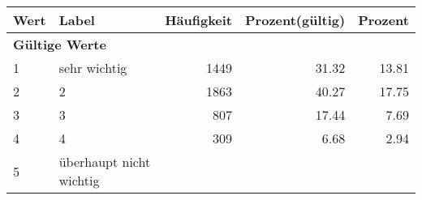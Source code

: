      \begin{longtable}{lXrrr}
     \toprule
     \textbf{Wert} & \textbf{Label} & \textbf{Häufigkeit} & \textbf{Prozent(gültig)} & \textbf{Prozent} \\
     \endhead
     \midrule
     \multicolumn{5}{l}{\textbf{Gültige Werte}}\\

     1 &
     \multicolumn{1}{X}{ sehr wichtig   } &


       \num{1449} &
       \num[round-mode=places,round-precision=2]{31,32} &
         \num[round-mode=places,round-precision=2]{13,81} \\

     2 &
     \multicolumn{1}{X}{ 2   } &


       \num{1863} &
       \num[round-mode=places,round-precision=2]{40,27} &
         \num[round-mode=places,round-precision=2]{17,75} \\

     3 &
     \multicolumn{1}{X}{ 3   } &


       \num{807} &
       \num[round-mode=places,round-precision=2]{17,44} &
         \num[round-mode=places,round-precision=2]{7,69} \\

     4 &
     \multicolumn{1}{X}{ 4   } &


       \num{309} &
       \num[round-mode=places,round-precision=2]{6,68} &
         \num[round-mode=places,round-precision=2]{2,94} \\

     5 &
     \multicolumn{1}{X}{ überhaupt nicht wichtig   } &



\end{longtable}
